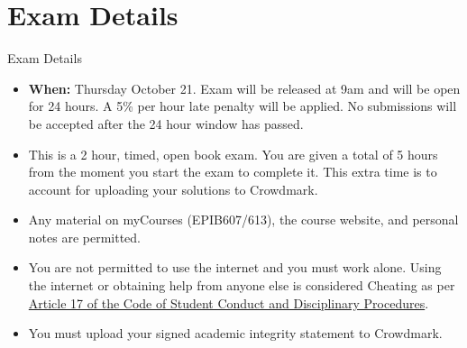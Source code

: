 \documentclass[10pt,handout]{beamer}\usepackage[]{graphicx}\usepackage[]{color}
\begin{document}
\section{Exam Details}
\begin{frame}{Exam Details}
	
	\begin{itemize}
		\setlength\itemsep{.51em}
		\item \textbf{When:} Thursday October 21. Exam will be released at 9am and will be open for 24 hours. A 5\% per hour late penalty will be applied. No submissions will be accepted after the 24 hour window has passed. 
		
		\item This is a 2 hour, timed, open book exam.  You are given a total of 5 hours from the moment you start the exam to complete it. This extra time is to account for uploading your solutions to Crowdmark. 
		
		\item Any material on myCourses (EPIB607/613), the course website, and personal notes are permitted.
		
		\item You are not permitted to use the internet and you must work alone. Using the internet or obtaining help from anyone else is considered Cheating as per \href{https://www.mcgill.ca/students/srr/academicrights/integrity/cheating}{Article 17 of the Code of Student Conduct and Disciplinary Procedures}. 

		\item You must upload your signed academic integrity statement to Crowdmark. 
		
		
	\end{itemize}
	
\end{frame}
\end{document}
